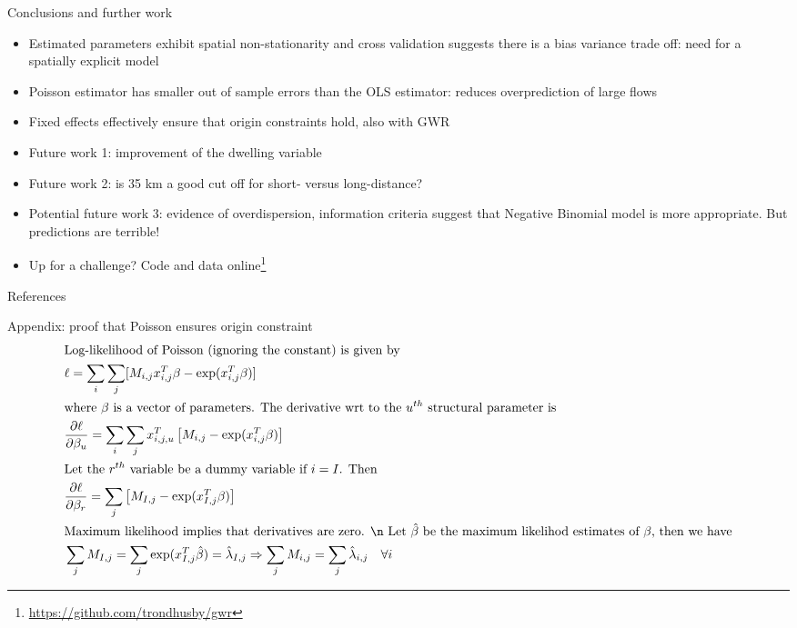 \documentclass[final, 12pt, aspectratio=169, xcolor={dvipsnames}]{beamer}
\begin{document}
\begin{frame}{Conclusions and further work}
  \begin{itemize}
    \item Estimated parameters exhibit spatial non-stationarity and cross validation suggests there is a bias variance trade off: need for a spatially explicit model
    \item Poisson estimator has smaller out of sample errors than the OLS estimator: reduces overprediction of large flows
      \item Fixed effects effectively ensure that origin constraints hold, also with GWR
      \item Future work 1: improvement of the dwelling variable
        \item Future work 2: is 35 km a good cut off for short- versus long-distance?
        \item Potential future work 3: evidence of overdispersion, information criteria suggest that Negative Binomial model is more appropriate. But predictions are terrible!
          \item Up for a challenge? Code and data online\footnote{\scriptsize\url{https://github.com/trondhusby/gwr}}
    \end{itemize}
  \end{frame}

\begin{frame}[t,allowframebreaks]{References}
\printbibliography
\end{frame}


\begin{frame}{Appendix: proof that Poisson ensures origin constraint \citep{davies1987statistical}}
  \scriptsize
  \begin{align*}
    &\text{Log-likelihood of Poisson (ignoring the constant) is given by} \\
    &\ell = \sum\limits_{i} \sum\limits_{j} [ M_{i,j} x^{T}_{i,j} \beta - \exp(x^{T}_{i,j}\beta) ] \\
    &\text{where $\beta$ is a vector of parameters. The derivative wrt to the $u^{th}$ structural parameter is} \\
    &\frac{\partial \ell}{\partial \beta_{u}} = \sum\limits_{i} \sum\limits_{j} x^{T}_{i,j, u} \left[ M_{i,j} - \exp(x^{T}_{i,j}\beta)\right] \\
    &\text{Let the $r^{th}$ variable be a dummy variable if $i = I$. Then } \\
    &\frac{\partial \ell}{\partial \beta_{r}} = \sum\limits_{j} \left[ M_{I,j} - \exp(x^{T}_{I,j} \beta)\right] \\
    &\text{Maximum likelihood implies that derivatives are zero. \n Let $\hat{\beta}$ be the maximum likelihod estimates of $\beta$, then we have}\\
    &\sum\limits_{j} M_{I,j} = \sum\limits_{j} \exp(x^{T}_{I,j} \hat{\beta}) = \hat{\lambda}_{I,j}
    \Rightarrow \sum\limits_{j} M_{i,j} = \sum\limits_{j} \hat{\lambda}_{i,j} \quad \forall i
  \end{align*}
\end{frame}
\end{document}
